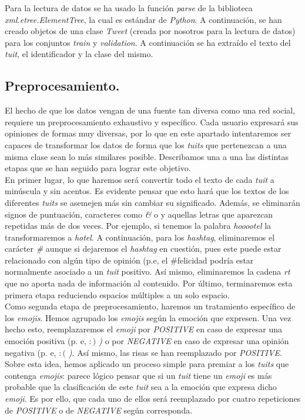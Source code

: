 \documentclass[11pt]{article}
\begin{document}
Para la lectura de datos se ha usado la función \textit{parse} de la biblioteca \textit{xml.etree.ElementTree}, la cual es estándar de \textit{Python}. A continuación, se han creado objetos de una clase \textit{Tweet} (creada por nosotros para la lectura de datos) para los conjuntos \textit{train} y \textit{validation}. A continuación se ha extraído el texto del \textit{tuit}, el identificador y la clase del mismo.

\subsection{Preprocesamiento.} \label{preprocesamiento}
El hecho de que los datos vengan de una fuente tan diversa como una red social, requiere un preprocesamiento exhaustivo y específico. Cada usuario expresará sus opiniones de formas muy diversas, por lo que en este apartado intentaremos ser capaces de transformar los datos de forma que los \textit{tuits} que pertenezcan a una misma clase sean lo más similares posible. Describamos una a una las distintas etapas que se han seguido para lograr este objetivo.
\\

En primer lugar, lo que haremos será convertir todo el texto de cada \textit{tuit} a minúscula y sin acentos. Es evidente pensar que esto hará que los textos de los diferentes \textit{tuits} se asemejen más sin cambiar su significado. Además, se eliminarán signos de puntuación, caracteres como \textit{\&} o \textit{\-} y aquellas letras que aparezcan repetidas más de dos veces. Por ejemplo, si tenemos la palabra \textit{hooootel} la transformaremos a \textit{hotel}. A continuación, para los \textit{hashtag}, eliminaremos el carácter \textit{\#} aunque si dejaremos el \textit{hashtag} en cuestión, pues este puede estar relacionado con algún tipo de opinión (p.e, el \#felicidad podría estar normalmente asociado a un \textit{tuit} positivo. Así mismo, eliminaremos la cadena \textit{rt} que no aporta nada de información al contenido. Por último, terminaremos esta primera etapa reduciendo espacios múltiples a un solo espacio.
\\

Como segunda etapa de preprocesamiento, haremos un tratamiento específico de los \textit{emojis}. Hemos agrupado los \textit{emojis} según la emoción que expresen. Una vez hecho esto, reemplazaremos el \textit{emoji} por \textit{POSITIVE} en caso de expresar una emoción positiva (p. e, \textit{$:)$ )} o por \textit{NEGATIVE} en caso de expresar una opinión negativa (p. e, \textit{$:($ )}. Así mismo, las risas se han reemplazado por \textit{POSITIVE}. Sobre esta idea, hemos aplicado un proceso simple para premiar a los \textit{tuits} que contenga \textit{emojis}: parece lógico pensar que si un \textit{tuit} tiene un \textit{emoji} es más probable que la clasificación de este \textit{tuit} sea a la emoción que expresa dicho \textit{emoji}. Es por ello, que cada uno de ellos será reemplazado por cuatro repeticiones de \textit{POSITIVE} o de \textit{NEGATIVE} según corresponda.
\\
\end{document}
